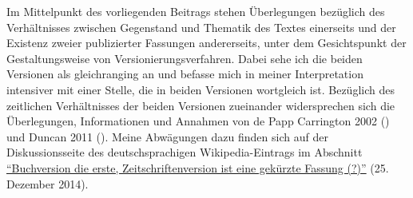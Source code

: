 \documentclass[fontsize=12pt]{scrartcl}
\begin{document}
Im Mittelpunkt des vorliegenden Beitrags stehen \"Uberlegungen bez\"uglich des Ver\-h\"alt\-nis\-ses zwischen Gegenstand und Thematik des Textes einerseits und der Existenz zweier pu\-bli\-zierter Fassungen an\-de\-rerseits, unter dem Gesichtspunkt der Gestaltungsweise von Versionierungsverfahren. Dabei sehe ich die beiden Versionen als gleichranging an und befasse mich in meiner Interpretation intensiver mit einer Stelle, die in beiden Versionen wortgleich ist. Bez\"uglich des zeitlichen Verh\"altnisses der beiden Versionen zueinander widersprechen sich die \"Uberlegungen, Informationen und Annahmen von de Papp Carrington 2002 (\cite{dePappCarrington2002}) und Duncan 2011 (\cite{Duncan2011}). Meine Abw\"agungen dazu finden sich auf der Dis\-kus\-si\-onsseite des deutschspra\-chi\-gen Wi\-ki\-pe\-dia-Eintrags im Abschnitt \href{https://de.wikipedia.org/w/index.php?title=Diskussion:Save_the_Reaper\&oldid=137099675#Buchversion_die_erste.2C_Zeitschriftenversion_ist_eine_gek.C3.BCrzte_Fassung_.28.3F.29}{"`Buchversion die erste, Zeitschriftenversion ist eine gek\"urzte Fassung (?)"'} (25. Dezember 2014).
\end{document}
